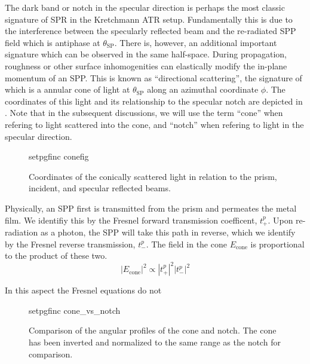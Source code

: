 The dark band or notch in the specular direction is perhaps the most
classic signature of SPR in the Kretchmann ATR setup.  Fundamentally this
is due to the interference between the specularly reflected beam and the
re-radiated SPP field which is antiphase at $\theta_\mathrm{SP}$.  There
is, however, an additional important signature which can be observed in the
same half-space.  During propagation, roughness or other surface
inhomogenities can elastically modify the in-plane momentum of an SPP.
This is known as ``directional scattering'', the signature of which is a
annular cone of light at $\theta_\mathrm{SP}$ along an azimuthal coordinate
$\phi$.  The coordinates of this light and its relationship to the specular
notch are depicted in .  Note that in the subsequent
discussions, we will use the term ``cone'' when refering to light scattered
into the cone, and ``notch'' when refering to light in the specular
direction.
\begin{figure}[ht]
 \centering
 {setpgfinc}
 {conefig}
 \caption{Coordinates of the conically scattered light in relation to the
 prism, incident, and specular reflected beams.}
 \label{fig:conefig}
\end{figure}


Physically, an SPP first is transmitted from the prism and permeates the
metal film.  We identifiy this by the Fresnel forward transmission
coefficent, $t^p_+$.  Upon re-radiation as a photon, the SPP will take this
path in reverse, which we identify by the Fresnel reverse transmission,
$t^p_-$.  The field in the cone $E_\mathrm{cone}$ is proportional to the
product of these two.
\begin{equation}
|E_\mathrm{cone}|^2 \propto	|t^p_+|^2 |t^p_-|^2
\end{equation}

In this aspect the Fresnel equations do not 

\begin{figure}[ht]
 \centering
 {setpgfinc}
 {cone_vs_notch}
 \caption{Comparison of the angular profiles of the cone and notch.  The
	cone has been inverted and normalized to the same range as the notch for
	comparison.}
 \label{fig:conevsnotch}
\end{figure}


